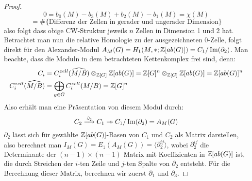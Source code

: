 \begin{proof}
	\[
		0=b_0(M)-b_3(M)+b_2(M)-b_1(M) = \chi(M) 
	\]
	\[
		= \#\{\text{Differenz der Zellen in gerader und ungerader Dimension}\}
	\]
	also folgt dass obige CW-Struktur jeweils $n$ Zellen in Dimension 1 und 2 hat. Betrachtet man nun die relative Homologie zu der ausgezeichneten $0$-Zelle, folgt direkt für den Alexander-Modul $A_M(G)= H_1(M,*;\mathbb{Z}[ab(G)])=C_1/\operatorname{Im}(\partial _2)$. Man beachte, dass die Moduln in dem betrachteten Kettenkomplex frei sind, denn: 
	\begin{align*}
		C_i &=C_i^{zell}(\widehat{M/B})\otimes_{\mathbb{Z}[G]}\mathbb{Z}[ab(G)] = \mathbb{Z}[G]^n \otimes_{\mathbb{Z}[G]} \mathbb{Z}[ab(G)] = \mathbb{Z}[ab(G)]^n\\
		C_i^{zell}(\widehat{M/B}) &= \bigoplus_{g \in G} C_i^{zell}(M/B) = \mathbb{Z}[G]^n
	\end{align*}
	Also erhält man eine Präsentation von diesem Modul durch:
	\[
		C_2 \stackrel {\partial_2} \longrightarrow C_1 \twoheadrightarrow C_1/\operatorname{Im}(\partial_2) = A_M(G)
	\]
	$\partial_2$ lässt sich für gewählte $\mathbb{Z}[ab(G)]$-Basen von $C_1$ und $C_2$ als Matrix darstellen, also berechnet man $I_M(G)=E_1(A_M(G))=\langle \partial_2^{ij} \rangle$, wobei $\partial_2^{ij}$ die Determinante der $(n-1)\times (n-1)$ Matrix mit Koeffizienten in $\mathbb{Z}[ab(G)]$ ist, die durch Streichen der $i$-ten Zeile und $j$-ten Spalte von $\partial_2$ entsteht. Für die Berechnung dieser Matrix, berechnen wir zuerst $\partial_1$ und $\partial_3$.

\end{proof}
